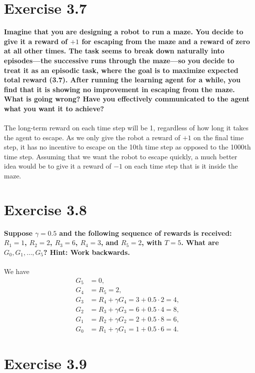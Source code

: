 \documentclass[a4paper,11pt]{article}
\numberwithin{equation}{section}
\theoremstyle{remark}
\begin{document}
\section{Exercise 3.7}

\textbf{Imagine that you are designing a robot to run a maze. You decide to give it a reward of $+1$ for escaping from the maze and a reward of zero at all other times. The task seems to break down naturally into episodes—the successive runs through the maze—so you decide to treat it as an episodic task, where the goal is to maximize expected total reward (3.7). After running the learning agent for a while, you find that it is showing no improvement in escaping from the maze. What is going wrong? Have you effectively communicated to the agent what you want it to achieve?}
\\ \\
The long-term reward on each time step will be 1, regardless of how long it takes the agent to escape. As we only give the robot a reward of $+1$ on the final time step, it has no incentive to escape on the 10th time step as opposed to the 1000th time step. Assuming that we want the robot to escape quickly, a much better idea would be to give it a reward of $-1$ on each time step that is it inside the maze. 

\section{Exercise 3.8}

\textbf{Suppose $\gamma = 0.5$ and the following sequence of rewards is received: $R_1 = 1$, $R_2 = 2$, $R_3 = 6$, $R_4 = 3$, and $R_5 = 2$, with $T = 5$. What are $G_0, G_1, \dots, G_5$? Hint: Work backwards.}
\\ \\
We have
\begin{align*}
	G_5 & = 0, \\
	G_4 & = R_5 = 2, \\
	G_3 & = R_4 + \gamma G_4 = 3 + 0.5 \cdot 2 = 4, \\
	G_2 & = R_3 + \gamma G_3 = 6 + 0.5 \cdot 4 = 8, \\
	G_1 & = R_2 + \gamma G_2 = 2 + 0.5 \cdot 8 = 6, \\
	G_0 & = R_1 + \gamma G_1 = 1 + 0.5 \cdot 6 = 4. 
\end{align*}
	
\section{Exercise 3.9}
\end{document}
